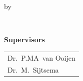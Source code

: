\begin{titlepage}
\begin{center}
\bigskip
\bigskip

by

\bigskip
\bigskip

\makeatletter
{\Large\titlefont\bfseries\@firstname\ \titleshape{\MakeUppercase{\@lastname}}}
\makeatother

\bigskip
\bigskip



\vspace*{2\bigskipamount}

\end{center}

\clearpage
\thispagestyle{empty}

\noindent \textbf{Supervisors}

\medskip\noindent
\begin{tabular}{l}
    Dr.\ P.MA\ van Ooijen\\ Dr.\ M.\ Sijtsema 
\end{tabular}

\bigskip


    

\end{titlepage}
